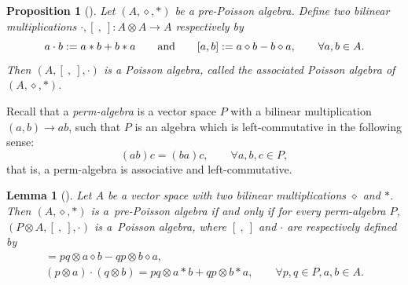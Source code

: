 \documentclass[10pt,a4paper]{amsart}
\numberwithin{equation}{section}
\newtheorem{Lemma}[Theorem]{Lemma}
\newtheorem{Proposition}[Theorem]{Proposition}
{ \theoremstyle{definition}
	\newtheorem{Definition}[Theorem]{Definition}
	\newtheorem{Note}[Theorem]{Note}
	\newtheorem{Example}[Theorem]{Example}
	\newtheorem{Remark}[Theorem]{Remark} }
\begin{document}
\begin{Proposition}[{\cite[Proposition~2.2]{aguiar2000pre}}]\label{pro:pptp}
 Let $(A, \diamond, \ast)$ be a pre-Poisson algebra.
 Define two bilinear multiplications $\cdot, [\ ,\ ]\colon A\otimes A\rightarrow A$ respectively by
 \begin{equation}
 a \cdot b := a \ast b + b \ast a \qquad {\rm and} \qquad
 [a, b] := a \diamond b - b \diamond a, \qquad
 \forall a, b \in A. \label{eq:pptp}
 \end{equation}
 Then $(A, [\ ,\ ], \cdot)$ is a Poisson algebra,
 called the \textit{associated Poisson algebra of $(A, \diamond, \ast)$}.
\end{Proposition}

Recall that a \textit{perm-algebra} is a vector space $P$ with a bilinear multiplication $(a,b) \to ab$,
such that $P$ is an algebra which is left-commutative in the following sense:
\begin{equation*}
	(ab)c = (ba)c, \qquad \forall a, b, c \in P,
\end{equation*}
that is, a perm-algebra is associative and left-commutative.

\begin{Lemma}[\cite{gubarev2014operads}]\label{lem:perm}
Let $A$ be a vector space with two bilinear multiplications $\diamond$ and $*$.
Then $(A, \diamond , *)$ is a~pre-Poisson algebra if and only if for every perm-algebra $P$,
$(P \otimes A, [\ ,\ ], \cdot)$ is a~Poisson algebra, where $[\ ,\ ]$ and $\cdot$ are respectively defined by
	\begin{gather*}
		[p \otimes a, q \otimes b] = pq \otimes a \diamond b - qp \otimes b \diamond a,\\
		(p \otimes a) \cdot (q \otimes b) = pq \otimes a*b + qp \otimes b*a, \qquad \forall p, q \in P , a, b \in A.
	\end{gather*}
\end{Lemma}
\end{document}
